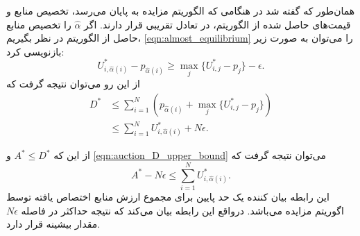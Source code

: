      همان‌طور که گفته شد در هنگامی که الگوریتم مزایده به پایان می‌رسد، تخصیص منابع و قیمت‌های حاصل شده از الگوریتم، در تعادل تقریبی قرار دارند.
      اگر $\hat \alpha$ را تخصیص منابع حاصل از الگوریتم در نظر بگیریم، \cref{eqn:almost_equilibrium} را می‌توان به صورت زیر باز‌نویسی کرد:
      \begin{equation}\label{eqn:auction_almost_equilibrium2}
        U_{i, \hat \alpha(i)}^* - p_{\hat \alpha(i)} \ge \max_j \{U_{i,j}^*-p_j\}-\epsilon.
      \end{equation}
      از این رو می‌توان نتیجه گرفت که
      \begin{align}
        D^* & \le \sum_{i=1}^N \left(p_{\hat \alpha (i)}+\max_j\{U_{i,j}^*-p_j\}\right) \\
            & \le \sum_{i=1}^N U_{i, \hat \alpha (i)}^* + N \epsilon \label{eqn:auction_D_upper_bound}.
      \end{align}

      از این که $A^* \le D^*$ و \cref{eqn:auction_D_upper_bound} می‌توان نتیجه گرفت که
      \begin{equation}
        A^* - N \epsilon \le \sum_{i=1}^N U_{i, \hat \alpha (i)}^*.
      \end{equation}
      این رابطه بیان کننده یک حد پایین برای مجموع ارزش منابع اختصاص یافته توسط اگوریتم مزایده می‌باشد.
      درواقع این رابطه بیان می‌کند که نتیجه حداکثر در فاصله $N \epsilon$ مقدار بیشینه قرار دارد.
